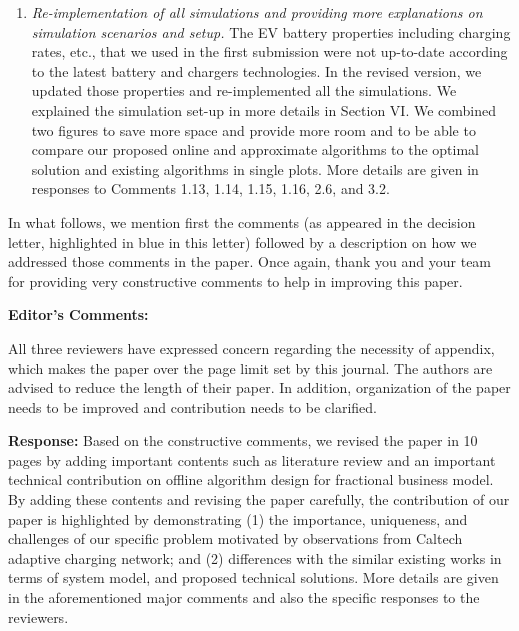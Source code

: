 \documentclass[11pt]{article}
\newcommand{\rev}[1]{{\color{black}#1}}%
\newcommand{\rev}[1]{#1}
\begin{document}
\begin{enumerate}
\item \textit{Re-implementation of all simulations and providing more explanations on simulation scenarios and setup.}  The EV battery properties including charging rates, etc., that we used in the first submission were not up-to-date according to the latest battery \rev{and chargers} technologies. In the revised version, we updated those properties and re-implemented all the simulations. We explained the simulation set-up in more details in Section VI. We combined two figures to save more space and provide more room and to be able to compare our proposed online and approximate algorithms to the optimal solution and existing algorithms in single plots. More details are given in responses to Comments 1.13, 1.14, 1.15, 1.16, 2.6, and 3.2.


\end{enumerate}


In what follows, we mention first the comments (as appeared in the decision letter, highlighted in {\color{blue} blue} in this letter) followed by a description on how we addressed those comments in the paper. Once again, thank you and your team for providing very constructive comments to help in improving this paper.



\newpage

{\Large\textbf{Editor's Comments:}}
\vspace{3mm}

{\color{blue}All three reviewers have expressed concern regarding the necessity of appendix, which makes the paper over the page limit set by this journal. The authors are advised to reduce the length of their paper. In addition, organization of the paper needs to be improved and contribution needs to be clarified.}

\vspace{5mm}
\noindent\textbf{Response:}
Based on the constructive comments, we revised the paper in 10 pages  by adding important contents such as literature review and an important technical contribution on offline algorithm design for fractional business model. 
By adding these contents and revising the paper carefully, the contribution of our paper is highlighted by demonstrating (1) the importance, uniqueness, and challenges of our specific problem motivated by observations from Caltech adaptive charging network; and (2) differences with the similar existing works in terms of system model, and proposed technical solutions.  More details are given in the aforementioned major comments and also the specific responses to the reviewers. 
\end{document}
